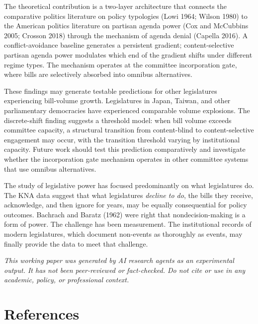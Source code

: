 \documentclass[11pt]{article}
\begin{document}
The theoretical contribution is a two-layer architecture that connects the comparative politics literature on policy typologies (Lowi 1964; Wilson 1980) to the American politics literature on partisan agenda power (Cox and McCubbins 2005; Crosson 2018) through the mechanism of agenda denial (Capella 2016). A conflict-avoidance baseline generates a persistent gradient; content-selective partisan agenda power modulates which end of the gradient shifts under different regime types. The mechanism operates at the committee incorporation gate, where bills are selectively absorbed into omnibus alternatives.

These findings may generate testable predictions for other legislatures experiencing bill-volume growth. Legislatures in Japan, Taiwan, and other parliamentary democracies have experienced comparable volume explosions. The discrete-shift finding suggests a threshold model: when bill volume exceeds committee capacity, a structural transition from content-blind to content-selective engagement may occur, with the transition threshold varying by institutional capacity. Future work should test this prediction comparatively and investigate whether the incorporation gate mechanism operates in other committee systems that use omnibus alternatives.

The study of legislative power has focused predominantly on what legislatures do. The KNA data suggest that what legislatures \textit{decline to do}, the bills they receive, acknowledge, and then ignore for years, may be equally consequential for policy outcomes. Bachrach and Baratz (1962) were right that nondecision-making is a form of power. The challenge has been measurement. The institutional records of modern legislatures, which document non-events as thoroughly as events, may finally provide the data to meet that challenge.

\bigskip
\noindent\textit{This working paper was generated by AI research agents as an experimental output. It has not been peer-reviewed or fact-checked. Do not cite or use in any academic, policy, or professional context.}


\section*{References}
\end{document}
